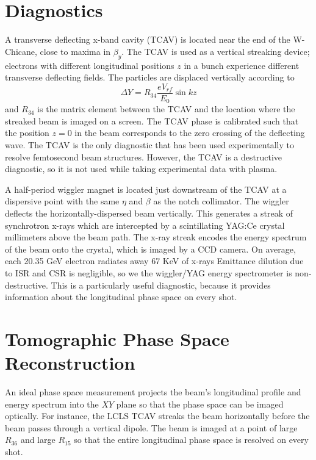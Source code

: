 \documentclass[%
twocolumn,
showpacs,preprintnumbers,
 aps,
prstab,
]{revtex4-1}
\begin{document}



\section{Diagnostics}\label{sec:diag}
A transverse deflecting x-band cavity (TCAV) is located near the end of the W-Chicane, close to maxima in $\beta_y$. The TCAV is used as a vertical streaking device; electrons with different longitudinal positions $z$ in a bunch experience different transverse deflecting fields. The particles are displaced vertically according to
\begin{equation}
\Delta Y = R_{34}\frac{e V_{rf}}{E_0}\sin{kz}
\end{equation}
and $R_{34}$ is the matrix element between the TCAV and the location where the streaked beam is imaged on a screen. The TCAV phase is calibrated such that the position $z=0$ in the beam corresponds to the zero crossing of the deflecting wave. The TCAV is the only diagnostic that has been used experimentally to resolve femtosecond beam structures. However, the TCAV is a destructive diagnostic, so it is not used while taking experimental data with plasma.

A half-period wiggler magnet is located just downstream of the TCAV at a dispersive point with the same $\eta$ and $\beta$ as the notch collimator. The wiggler deflects the horizontally-dispersed beam vertically. This generates a streak of synchrotron x-rays which are intercepted by a scintillating YAG:Ce crystal millimeters above the beam path. The x-ray streak encodes the energy spectrum of the beam onto the crystal, which is imaged by a CCD camera. On average, each 20.35 GeV electron radiates away 67 KeV of x-rays Emittance dilution due to ISR and CSR is negligible, so we the wiggler/YAG energy spectrometer is non-destructive. This is a particularly useful diagnostic, because it provides information about the longitudinal phase space on every shot.

\section{Tomographic Phase Space Reconstruction}\label{sec:tomo}
An ideal phase space measurement projects the beam's longitudinal profile and energy spectrum into the $XY$ plane so that the phase space can be imaged optically. For instance, the LCLS TCAV streaks the beam horizontally before the beam passes through a vertical dipole. The beam is imaged at a point of large $R_{36}$ and large $R_{15}$ so that the entire longitudinal phase space is resolved on every shot. 
\end{document}
